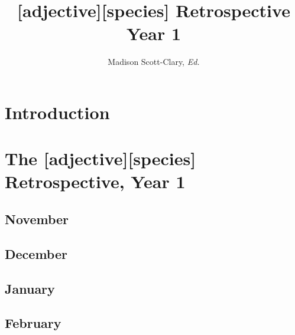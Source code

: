 \documentclass[12pt,letterpaper,oneside]{memoir}
\begin{document}
  \title{[adjective][species] Retrospective Year 1}
  \author{Madison Scott-Clary, \textit{Ed.}}
  \maketitle
  \newpage

  \tableofcontents

  \part{Introduction}
  

  \part{The [adjective][species] Retrospective, Year 1}
  \chapter{November}
  
  
  
  
  
  \chapter{December}
  
  
  
  
  \chapter{January}
  
  
  
  
  
  
  
  \chapter{February}
  
  
  
  
  
  
  
  
\end{document}
